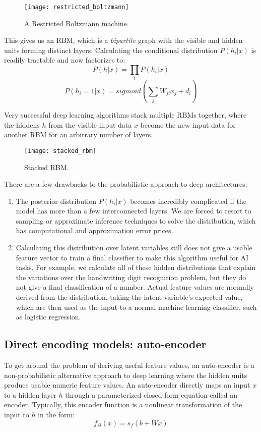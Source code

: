 \begin{figure}[h!]
  \centering
    \texttt{[image: restricted\_boltzmann]}
\caption{A Restricted Boltzmann machine.}
\end{figure}

This gives us an RBM, which is a \emph{bipartite} graph with the visible and hidden units forming distinct layers. Calculating the conditional distribution \(P(h_i | x)\) is readily tractable and now factorizes to: 
\[P(h | x) = \prod_i P(h_i | x)\]
\[P(h_i = 1 | x) = sigmoid \left( \sum_j W_{ji} x_j + d_i \right)\]

Very successful deep learning algorithms stack multiple RBMs together, where the hiddens \(h\) from the visible input data \(x\) become the new input data for another RBM for an arbitrary number of layers. 

\begin{figure}[h!]
  \centering
    \texttt{[image: stacked\_rbm]}
\caption{Stacked RBM.}
\end{figure}

There are a few drawbacks to the probabilistic approach to deep architectures:
\begin{enumerate}
\item The posterior distribution \(P(h_i | x)\) becomes incredibly complicated if the model has more than a few interconnected layers. We are forced to resort to sampling or approximate inference techniques to solve the distribution, which has computational and approximation error prices.
\item Calculating this distribution over latent variables still does not give a usable feature vector to train a final classifier to make this algorithm useful for AI tasks. For example, we calculate all of these hidden distributions that explain the variations over the handwriting digit recognition problem, but they do not give a final classification of a number. Actual feature values are normally derived from the distribution, taking the latent variable's expected value, which are then used as the input to a normal machine learning classifier, such as logistic regression.
\end{enumerate}

\subsection{Direct encoding models: auto-encoder}
To get around the problem of deriving useful feature values, an auto-encoder is a non-probabilistic alternative approach to deep learning where the hidden units produce usable numeric feature values. An auto-encoder directly maps an input \(x\) to a hidden layer \(h\) through a parameterized closed-form equation called an encoder. Typically, this encoder function is a nonlinear transformation of the input to \(h\) in the form:
\[f_\Theta (x) = s_f (b + Wx)\]

